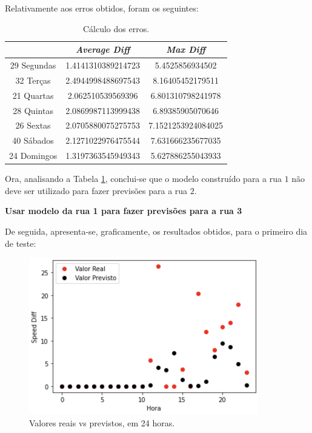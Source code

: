 \documentclass[a4paper, 12pt]{article}
\begin{document}
Relativamente aos erros obtidos, foram os seguintes:

\begin{table}[H]
	\centering
	\begin{tabular}{||c||c|c||}
		\hline\hline
		& \textit{Average Diff} & \textit{Max Diff} \\
		\hline\hline
		29 Segundas & 
		1.4141310389214723
 & 5.4525856934502\\
		\hline
		32 Terças  &
		2.4944998488697543
 & 8.16405452179511\\
		\hline
		21 Quartas & 
2.062510539569396
 & 6.801310798241978	\\
		\hline
		28 Quintas  & 
2.0869987113999438
 & 6.89385905070646	\\
		\hline
		26 Sextas & 
2.0705880075275753 & 7.1521253924084025	\\
		\hline
		40 Sábados  & 
2.1271022976475544 &7.631666235677035  \\
		\hline
		24 Domingos & 
1.3197363545949343
 & 
5.627886255043933
\\
		\hline\hline
	\end{tabular}
	\label{table:mod1_rua2}
	\caption{Cálculo dos erros.}
\end{table}

Ora, analisando a Tabela \ref{table:mod1_rua2}, conclui-se que o modelo construído para a rua $1$ não deve ser utilizado para fazer previsões para a rua $2$.

\vspace{0.5cm}
\textbf{Usar modelo da rua 1 para fazer previsões para a rua 3}

De seguida, apresenta-se, graficamente, os resultados obtidos, para o primeiro dia de teste:

\begin{figure}[H]
	\centering
	\includegraphics[width=10cm]{resultados/real_prev_mod1_rua3.png}
	\caption{Valores reais vs previstos, em 24 horas.}
\end{figure}
\end{document}
